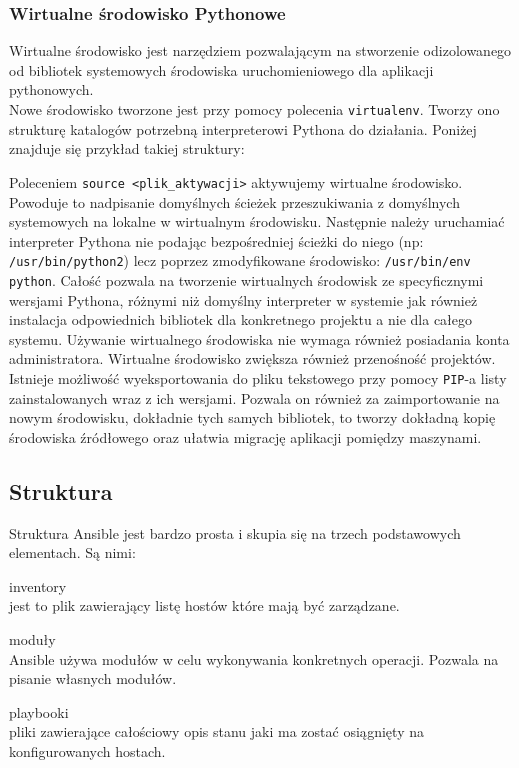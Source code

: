 \subsubsection{Wirtualne środowisko Pythonowe}
Wirtualne środowisko jest narzędziem pozwalającym na stworzenie odizolowanego od bibliotek systemowych środowiska uruchomieniowego dla aplikacji pythonowych.\\
Nowe środowisko tworzone jest przy pomocy polecenia \texttt{virtualenv}.
Tworzy ono strukturę katalogów potrzebną interpreterowi Pythona do działania. Poniżej znajduje się przykład takiej struktury:

Poleceniem \texttt{source <plik\_aktywacji>} aktywujemy wirtualne środowisko.
Powoduje to nadpisanie domyślnych ścieżek przeszukiwania z domyślnych systemowych na lokalne w wirtualnym środowisku.
Następnie należy uruchamiać interpreter Pythona nie podając bezpośredniej ścieżki do niego (np: \texttt{/usr/bin/python2}) lecz poprzez zmodyfikowane środowisko: \texttt{/usr/bin/env python}.
Całość pozwala na tworzenie wirtualnych środowisk ze specyficznymi wersjami Pythona, różnymi niż domyślny interpreter w systemie jak również instalacja odpowiednich bibliotek dla konkretnego projektu a nie dla całego systemu.
Używanie wirtualnego środowiska nie wymaga również posiadania konta administratora.  
Wirtualne środowisko zwiększa również przenośność projektów.
Istnieje możliwość wyeksportowania do pliku tekstowego przy pomocy \texttt{PIP}-a listy zainstalowanych wraz z ich wersjami.
Pozwala on również za zaimportowanie na nowym środowisku, dokładnie tych samych bibliotek, to tworzy dokładną kopię środowiska źródłowego oraz ułatwia migrację aplikacji pomiędzy maszynami.
\subsection{Struktura}
Struktura Ansible jest bardzo prosta i skupia się na trzech podstawowych elementach. Są nimi:
\begin{description}
\item {inventory}\\jest to plik zawierający listę hostów które mają być zarządzane.
\item {moduły}\\Ansible używa modułów w celu wykonywania konkretnych operacji. Pozwala na pisanie własnych modułów.
\item {playbooki}\\pliki zawierające całościowy opis stanu jaki ma zostać osiągnięty na konfigurowanych hostach.
\end{description}

